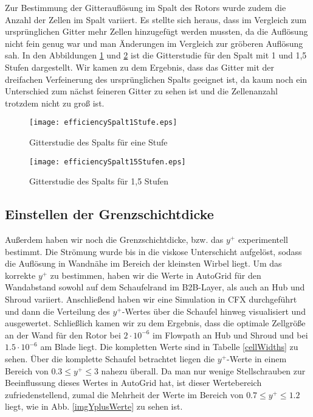 Zur Bestimmung der Gitterauflösung im Spalt des Rotors wurde zudem die Anzahl der Zellen im Spalt variiert. Es stellte sich heraus, dass im Vergleich zum ursprünglichen Gitter mehr Zellen hinzugefügt werden mussten, da die Auflösung nicht fein genug war und man Änderungen im Vergleich zur gröberen Auflösung sah.  In den Abbildungen \ref{effSpalt1} und \ref{effSpalt15} ist die Gitterstudie für den Spalt mit 1 und 1,5 Stufen dargestellt. Wir kamen zu dem Ergebnis, dass das Gitter mit der dreifachen Verfeinerung des ursprünglichen Spalts geeignet ist, da kaum noch ein Unterschied zum nächst feineren Gitter zu sehen ist und die Zellenanzahl trotzdem nicht zu groß ist.


\begin{figure}[H]
	\centering
	\texttt{[image: efficiencySpalt1Stufe.eps]}
	\caption{Gitterstudie des Spalts für eine Stufe} \label{effSpalt1}
\end{figure}

\begin{figure}[H]
	\centering
	\texttt{[image: efficiencySpalt15Stufen.eps]}
	\caption{Gitterstudie des Spalts für 1,5 Stufen} \label{effSpalt15}
\end{figure}

\subsection{Einstellen der Grenzschichtdicke}
Außerdem haben wir noch die Grenzschichtdicke, bzw. das $y^+$ experimentell bestimmt. Die Strömung wurde bis in die viskose Unterschicht aufgelöst, sodass die Auflösung in Wandnähe im Bereich der kleinsten Wirbel liegt. Um das korrekte $y^+$ zu bestimmen, haben wir die Werte in AutoGrid für den Wandabstand sowohl auf dem Schaufelrand im B2B-Layer, als auch an Hub und Shroud variiert.  Anschließend haben wir eine Simulation in CFX durchgeführt und dann die Verteilung des $y^+$-Wertes über die Schaufel hinweg visualisiert und ausgewertet. Schließlich kamen wir zu dem Ergebnis, dass die optimale Zellgröße an der Wand für den Rotor bei $2\cdot 10^{-6}$ im Flowpath an Hub und Shroud und bei $1.5\cdot 10^{-6}$ am Blade liegt. Die kompletten Werte sind in Tabelle \ref{cellWidths} zu sehen. Über die komplette Schaufel betrachtet liegen die $y^+$-Werte in einem Bereich von $0.3 \leq y^+ \leq 3$ nahezu überall. Da man nur wenige Stellschrauben zur Beeinflussung dieses Wertes in AutoGrid hat, ist dieser Wertebereich zufriedenstellend, zumal die Mehrheit der Werte im Bereich von $0.7 \leq y^+ \leq 1.2$  liegt, wie in Abb. \ref{imgYplusWerte} zu sehen ist. 

